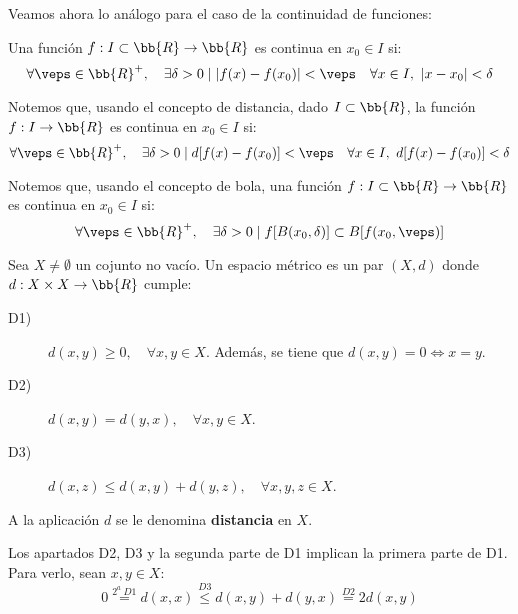 Veamos ahora lo análogo para el caso de la continuidad de funciones:
\begin{definicion}
    Una función $f:I\subset \bb{R}\to \bb{R}$ es continua en $x_0\in I$ si:
    \begin{equation*}
        \forall \veps\in \bb{R}^+,\quad \exists \delta>0 \mid |f(x)-f(x_0)|<\veps \quad \forall x\in I,~|x-x_0|< \delta 
    \end{equation*}
\end{definicion}

\begin{observacion}
    Notemos que, usando el concepto de distancia, dado $I\subset \bb{R}$, la función $f:I\to \bb{R}$ es continua en $x_0\in I$ si:
    \begin{equation*}
        \forall \veps\in \bb{R}^+,\quad \exists \delta>0 \mid d[f(x)-f(x_0)]<\veps \quad \forall x\in I,~d[f(x)-f(x_0)]< \delta 
    \end{equation*}

    Notemos que, usando el concepto de bola, una función $f:I\subset \bb{R}\to \bb{R}$ es continua en $x_0\in I$ si:
        \begin{equation*}
            \forall \veps\in \bb{R}^+,\quad \exists \delta>0 \mid f[B(x_0,\delta)]\subset B[f(x_0,\veps)]
        \end{equation*}
\end{observacion}


\begin{definicion} 
    Sea $X\neq \emptyset$ un cojunto no vacío. Un espacio métrico es un par $(X,d)$ donde $d:X\times X\to \bb{R}$ cumple:
    \begin{description}
        \item[D1)] $d(x,y)\geq 0, \quad \forall x,y\in X$. Además, se tiene que $d(x,y)=0\Longleftrightarrow x=y$.

        \item[D2)] $d(x,y)=d(y,x), \quad \forall x,y\in X$.

        \item[D3)] $d(x,z)\leq d(x,y)+d(y,z),\quad \forall x,y,z\in X$.
    \end{description}

    A la aplicación $d$ se le denomina \textbf{distancia} en $X$.
\end{definicion}

\begin{observacion}
    Los apartados D2, D3 y la segunda parte de D1 implican la primera parte de D1. Para verlo, sean $x,y\in X$:
    \begin{equation*}
        0\stackrel{2^a~D1}{=} d(x,x) \stackrel{D3}\leq d(x,y) + d(y,x) \stackrel{D2}{=} 2d(x,y)
    \end{equation*}
\end{observacion}

